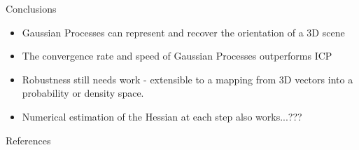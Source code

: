 \documentclass[final]{beamer}
\begin{document}
\begin{frame}{}
\begin{textblock}{27}
\begin{block}{Conclusions}
\begin{itemize}
\item Gaussian Processes can represent and recover the orientation of a 3D scene
\item The convergence rate and speed of Gaussian Processes outperforms ICP
\item Robustness still needs work - extensible to a mapping from 3D vectors into a probability or density space.
\item Numerical estimation of the Hessian at each step also works...???
\end{itemize}
\end{block}

\begin{block}{References}
{
 
 
}
\end{block}

\end{textblock}

\end{frame}
\end{document}
